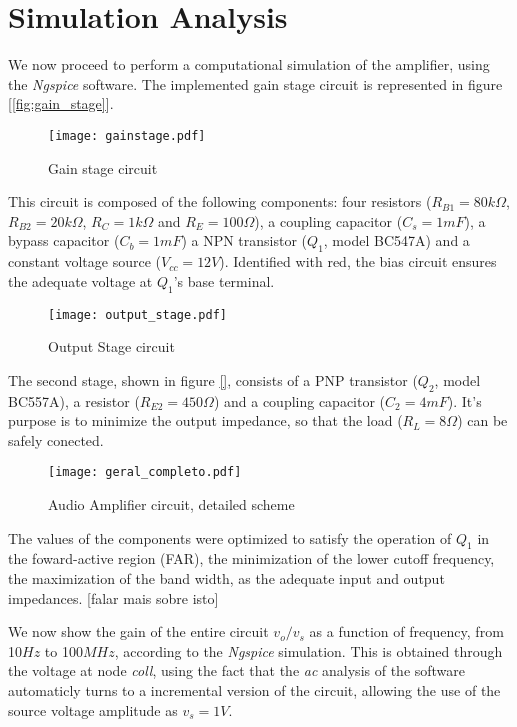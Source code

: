\section{Simulation Analysis}
\label{sec:simulation}

\par We now proceed to perform a computational simulation of the amplifier, using the \textit{Ngspice} software. The implemented gain stage circuit is represented in figure [\ref{fig:gain_stage}].

\begin{figure}[H]
\centering
  \texttt{[image: gainstage.pdf]}
  \caption{Gain stage circuit}
  \label{fig:gain_Stage}
\end{figure}

\par This circuit is composed of the following components: four resistors ($R_{B1}=80k\Omega$, $R_{B2}=20k\Omega$, $R_{C}=1k\Omega$ and $R_{E}=100\Omega$), a coupling capacitor ($C_s = 1 mF$), a bypass capacitor ($C_b=1mF$) a NPN transistor ($Q_1$, model BC547A) and a constant voltage source ($V_{cc}=12V$). Identified with red, the bias circuit ensures the adequate voltage at $Q_1$'s base terminal.

\begin{figure}[H]
\centering
  \texttt{[image: output\_stage.pdf]}
  \caption{Output Stage circuit}
  \label{fig:output_stage}
\end{figure}

\par The second stage, shown in figure \ref{}, consists of a PNP transistor ($Q_2$, model BC557A), a resistor ($R_{E2}=450\Omega$) and a coupling capacitor ($C_2=4mF$). It's purpose is to minimize the output impedance, so that the load ($R_L=8\Omega$) can be safely conected.

\begin{figure}[H]
\centering
  \texttt{[image: geral\_completo.pdf]}
  \caption{Audio Amplifier circuit, detailed scheme}
  \label{fig:complete_circuit}
\end{figure}

\par The values of the components were optimized to satisfy the operation of $Q_1$ in the foward-active region (FAR), the minimization of the lower cutoff frequency, the maximization of the band width, as the adequate input and output impedances. [falar mais sobre isto]

\par We now show the gain of the entire circuit $v_o / v_s$ as a function of frequency, from 10$Hz$ to 100$MHz$, according to the \textit{Ngspice} simulation. This is obtained through the voltage at node \textit{coll}, using the fact that the \textit{ac} analysis of the software automaticly turns to a incremental version of the circuit, allowing the use of the source voltage amplitude as $v_s = 1V$.

